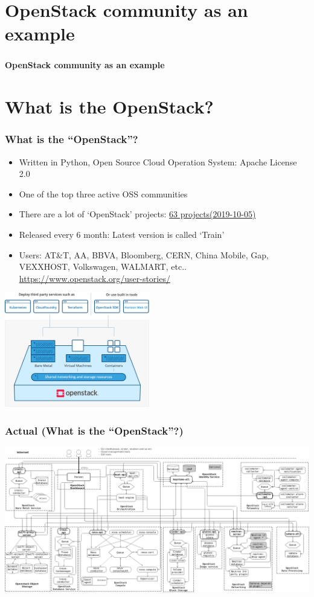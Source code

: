 \documentclass[aspectratio=169,11pt,hyperref={colorlinks=true}]{beamer}
\begin{document}
\section{OpenStack community as an example}
\begin{frame}
  \frametitle{ }
  \Huge{\bf{OpenStack community as an example}}
\end{frame}

\section{What is the OpenStack?}
\begin{frame}
  \frametitle{What is the ``OpenStack''?}
  \begin{itemize}
    \item Written in Python, Open Source Cloud Operation System: Apache License 2.0
    \item One of the top three active OSS communities
    \item There are a lot of `OpenStack' projects: \href{http://governance.openstack.org/reference/projects/index.html}{63 projects(2019-10-05)}
    \item Released every 6 month: Latest version is called `Train'
    \item Users: \scriptsize{AT\&T, AA, BBVA, Bloomberg, CERN,
      China Mobile, Gap, VEXXHOST,
      Volkswagen, WALMART, etc.. \url{https://www.openstack.org/user-stories/}}
  \end{itemize}
  \begin{center}
    \includegraphics[height=50mm]{images/openstack-simple.png}
  \end{center}
\end{frame}

\begin{frame}
  \frametitle{Actual (What is the ``OpenStack''?)}
  \begin{center}
    \includegraphics[width=1.0\textwidth]{images/openstack-arch-kilo-logical-v1.png}
  \end{center}
\end{frame}
\end{document}

